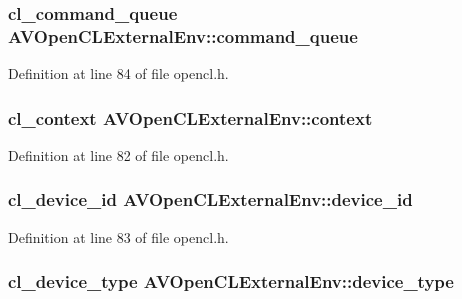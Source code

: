 \subsubsection[{\texorpdfstring{command\+\_\+queue}{command_queue}}]{\setlength{\rightskip}{0pt plus 5cm}cl\+\_\+command\+\_\+queue A\+V\+Open\+C\+L\+External\+Env\+::command\+\_\+queue}\hypertarget{struct_a_v_open_c_l_external_env_afa903036b4d30d8dd4cb13f4bfe7810c}{}\label{struct_a_v_open_c_l_external_env_afa903036b4d30d8dd4cb13f4bfe7810c}


Definition at line 84 of file opencl.\+h.

\subsubsection[{\texorpdfstring{context}{context}}]{\setlength{\rightskip}{0pt plus 5cm}cl\+\_\+context A\+V\+Open\+C\+L\+External\+Env\+::context}\hypertarget{struct_a_v_open_c_l_external_env_aa527fab85ce8f350fc0cf56ba172d760}{}\label{struct_a_v_open_c_l_external_env_aa527fab85ce8f350fc0cf56ba172d760}


Definition at line 82 of file opencl.\+h.

\subsubsection[{\texorpdfstring{device\+\_\+id}{device_id}}]{\setlength{\rightskip}{0pt plus 5cm}cl\+\_\+device\+\_\+id A\+V\+Open\+C\+L\+External\+Env\+::device\+\_\+id}\hypertarget{struct_a_v_open_c_l_external_env_a662dfc049e9e00cded39a89d0b17b572}{}\label{struct_a_v_open_c_l_external_env_a662dfc049e9e00cded39a89d0b17b572}


Definition at line 83 of file opencl.\+h.

\subsubsection[{\texorpdfstring{device\+\_\+type}{device_type}}]{\setlength{\rightskip}{0pt plus 5cm}cl\+\_\+device\+\_\+type A\+V\+Open\+C\+L\+External\+Env\+::device\+\_\+type}\hypertarget{struct_a_v_open_c_l_external_env_a25022bf4d407099e62769ed967082a05}{}\label{struct_a_v_open_c_l_external_env_a25022bf4d407099e62769ed967082a05}


